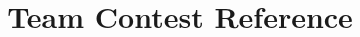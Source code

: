 \documentclass{article}
\title{Team Contest Reference}
\author{\teamname \\ \university}
\begin{document}
\maketitle
\setlength{\columnsep}{1cm}
\begin{multicols}{3}
	\tableofcontents
\end{multicols}
\newpage

\begin{multicols}{2}
  
  
  
  
  
  
  
\end{multicols}
\end{document}
